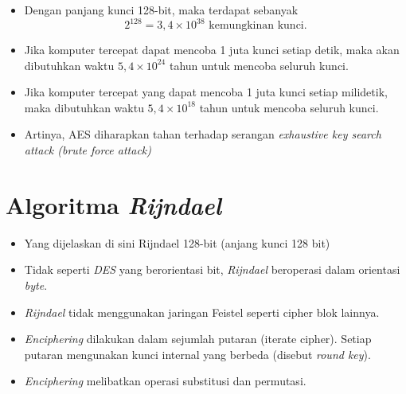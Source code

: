 \documentclass{article}
\begin{document}
\newpage


\begin{itemize}
    \item Dengan panjang kunci 128-bit, maka terdapat sebanyak
    \[ 2^{128} = 3,4 \times 10^{38} \text{ kemungkinan kunci.} \]
    \item Jika komputer tercepat dapat mencoba 1 juta kunci setiap detik, maka akan dibutuhkan waktu $5,4 \times 10^{24}$ tahun untuk mencoba seluruh kunci.
    \item Jika komputer tercepat yang dapat mencoba 1 juta kunci setiap milidetik, maka dibutuhkan waktu $5,4 \times 10^{18}$ tahun untuk mencoba seluruh kunci.
    \item Artinya, AES diharapkan tahan terhadap serangan \textit{exhaustive key search attack (brute force attack)}
\end{itemize}

\newpage


\section*{Algoritma \textit{Rijndael}}

\begin{itemize}
    \item Yang dijelaskan di sini Rijndael 128-bit (anjang kunci 128 bit)
    \item Tidak seperti \textit{DES} yang berorientasi bit, \textit{Rijndael} beroperasi dalam orientasi \textit{byte}.
    \item \textit{Rijndael} tidak menggunakan jaringan Feistel seperti cipher blok lainnya.
    \item \textit{Enciphering} dilakukan dalam sejumlah putaran (iterate cipher). Setiap putaran mengunakan kunci internal yang berbeda (disebut \textit{round key}).
    \item \textit{Enciphering} melibatkan operasi substitusi dan permutasi.
\end{itemize}

\newpage

\end{document}
